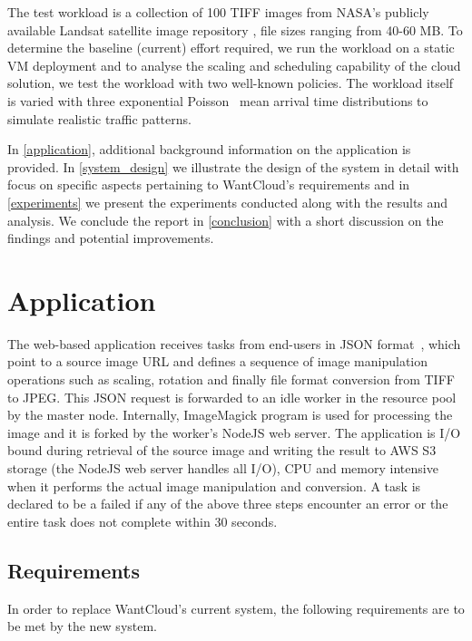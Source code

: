 \documentclass[a4paper]{IEEEtran}
\begin{document}
The test workload is a collection of 100 TIFF images from NASA's publicly available Landsat satellite image repository \cite{landsat_s3}, file sizes ranging from 40-60 MB. To determine the baseline (current) effort required, we run the workload on a static VM deployment and to analyse the scaling and scheduling capability of the cloud solution, we test the workload with two well-known policies. The workload itself is varied with three exponential Poisson~\cite{poisson} mean arrival time distributions to simulate realistic traffic patterns.

In \autoref{application}, additional background information on the application is provided. In \autoref{system_design} we illustrate the design of the system in detail with focus on specific aspects pertaining to
WantCloud's requirements and in \autoref{experiments} we present the experiments conducted along with the
results and analysis. We conclude the report in \autoref{conclusion} with a short discussion on the findings and potential improvements.

\section{Application} \label{application}

The web-based application receives tasks from end-users in JSON format~\cite{rfc7159}, which point to a source image URL and defines a sequence of image manipulation operations such as scaling, rotation and finally file format conversion from TIFF to JPEG. This JSON request is forwarded to an idle worker in the resource pool by the master node. Internally, ImageMagick program is used for processing the image and it is forked by the worker's NodeJS web server. The application is I/O bound during retrieval of the source image and writing the result to AWS S3 storage (the NodeJS web server handles all I/O), CPU and memory intensive when it performs the actual image manipulation and conversion. A task is declared to be a failed if any of the above three steps encounter an error or the entire task does not complete within 30 seconds.

\subsection{Requirements}

In order to replace WantCloud's current system, the following requirements are to be met by the new system.
\end{document}
